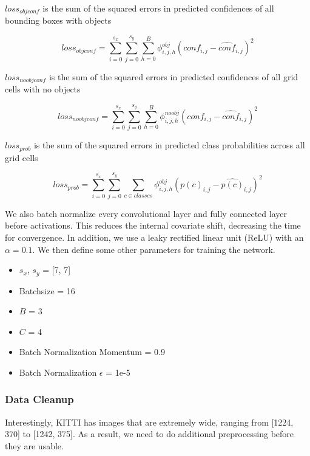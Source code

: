 \documentclass{article}
\begin{document}
$loss_{objconf}$ is the sum of the squared errors in predicted confidences of all bounding boxes with objects

\begin{equation}
loss_{objconf} = \sum\limits_{i=0}^{s_x}\sum\limits_{j=0}^{s_y}\sum\limits_{h=0}^{B}\phi_{i,j,h}^{obj}(conf_{i,j} - \hat{conf}_{i,j})^2
\end{equation}

$loss_{noobjconf}$ is the sum of the squared errors in predicted confidences of all grid cells with no objects

\begin{equation}
loss_{noobjconf} = \sum\limits_{i=0}^{s_x}\sum\limits_{j=0}^{s_y}\sum\limits_{h=0}^{B}\phi_{i,j,h}^{noobj}(conf_{i,j} - \hat{conf}_{i,j})^2
\end{equation}

$loss_{prob}$ is the sum of the squared errors in predicted class probabilities across all grid cells

\begin{equation}
loss_{prob} = \sum\limits_{i=0}^{s_x}\sum\limits_{j=0}^{s_y}\sum\limits_{c\in classes}^{}\phi_{i,j,h}^{obj}(p(c)_{i,j} - \hat{p(c)}_{i,j})^2
\end{equation}

We also batch normalize every convolutional layer and fully connected layer before activations. This reduces the internal covariate shift, decreasing the time for convergence. In addition, we use a leaky rectified linear unit (ReLU) with an $\alpha = 0.1$. We then define some other parameters for training the network.

\begin{itemize}
  \item $s_x$, $s_y$ = [7, 7]
  \item Batchsize = 16
  \item $B$ = 3
  \item $C$ = 4
  \item Batch Normalization Momentum = 0.9
  \item Batch Normalization $\epsilon$ = 1e-5
\end{itemize}

\subsubsection{Data Cleanup}
Interestingly, KITTI has images that are extremely wide, ranging from [1224, 370] to [1242, 375]. As a result, we need to do additional preprocessing before they are usable.
\end{document}
